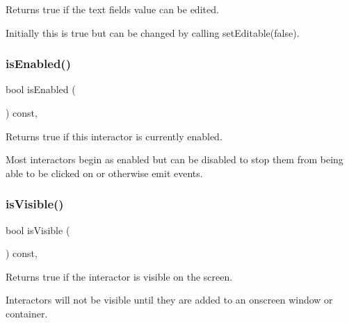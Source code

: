 Returns true if the text field\textquotesingle{}s value can be edited. 

Initially this is true but can be changed by calling set\+Editable(false). \mbox{\label{classsgl_1_1GInteractor_aacb819fb241851fd9fc045271baa4034}} 
\subsubsection{\texorpdfstring{is\+Enabled()}{isEnabled()}}
{\footnotesize\ttfamily bool is\+Enabled (\begin{DoxyParamCaption}{ }\end{DoxyParamCaption}) const\hspace{0.3cm}{\ttfamily [virtual]}, {\ttfamily [inherited]}}



Returns true if this interactor is currently enabled. 

Most interactors begin as enabled but can be disabled to stop them from being able to be clicked on or otherwise emit events. \mbox{\label{classsgl_1_1GInteractor_a9d8a6cfb13917785c143e74d40e4e2be}} 
\subsubsection{\texorpdfstring{is\+Visible()}{isVisible()}}
{\footnotesize\ttfamily bool is\+Visible (\begin{DoxyParamCaption}{ }\end{DoxyParamCaption}) const\hspace{0.3cm}{\ttfamily [virtual]}, {\ttfamily [inherited]}}



Returns true if the interactor is visible on the screen. 

Interactors will not be visible until they are added to an onscreen window or container. \mbox{\label{classsgl_1_1GInteractor_ab7fe7a876367b87cf7202f947f1d05e4}} 
